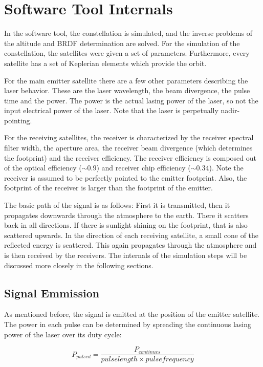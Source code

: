 \section{Software Tool Internals}
\label{SoftwareToolInternals}

In the software tool, the constellation is simulated, and the inverse problems of the altitude and BRDF determination are solved. For the simulation of the constellation, the satellites were given a set of parameters. Furthermore, every satellite has a set of Keplerian elements which provide the orbit. 

For the main emitter satellite there are a few other parameters describing the laser behavior. These are the laser wavelength, the beam divergence, the pulse time and the power. The power is the actual lasing power of the laser, so not the input electrical power of the laser. Note that the laser is perpetually nadir-pointing.

For the receiving satellites, the receiver is characterized by the receiver spectral filter width, the aperture area, the receiver beam divergence (which determines the footprint) and the receiver efficiency. The receiver efficiency is composed out of the optical efficiency ($\sim0.9$) and receiver chip efficiency ($\sim0.34$). Note the receiver is assumed to be perfectly pointed to the emitter footprint. Also, the footprint of the receiver is larger than the footprint of the emitter.

The basic path of the signal is as follows: First it is transmitted, then it propagates downwards through the atmosphere to the earth. There it scatters back in all directions. If there is sunlight shining on the footprint, that is also scattered upwards. In the direction of each receiving satellite, a small cone of the reflected energy is scattered. This again propagates through the atmosphere and is then received by the receivers. The internals of the simulation steps will be discussed more closely in the following sections.


\subsection{Signal Emmission}
As mentioned before, the signal is emitted at the position of the emitter satellite. The power in each pulse can be determined by spreading the continuous lasing power of the laser over its duty cycle:

\begin{equation}
	P_{pulsed} =  \frac{P_{continues}}{pulse length \times pulse frequency}
\end{equation}

